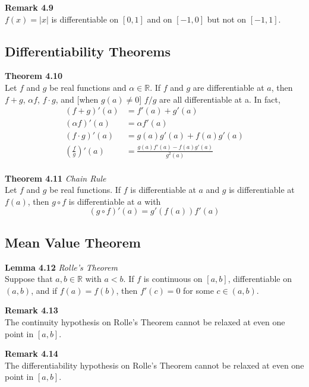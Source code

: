 \documentclass[8pt,landscape]{article}
\begin{document}
\begin{multicols}{3}
    \textbf{Remark 4.9} \\
    $f(x) = |x|$ is differentiable on $[0, 1]$ and on $[-1, 0]$ but not on $[-1, 1]$.

    \subsection{Differentiability Theorems}

    \textbf{Theorem 4.10} \\
    Let $f$ and $g$ be real functions and $\alpha \in \mathbb{R}$.
    If $f$ and $g$ are differentiable at $a$, then $f+g$, $\alpha f$, $f \cdot g$,
    and [when $g(a) \neq 0$] $f/g$ are all differentiable at a.
    In fact,
    \begin{align*}{}
        (f+g)'(a) &= f'(a) + g'(a) \\
        (\alpha f)'(a) &= \alpha f'(a) \\
        (f \cdot g)'(a) &= g(a) g'(a) + f(a) g'(a) \\
        \left( \frac{f}{g}\right)'(a) &= \frac{g(a) f'(a) - f(a) g'(a)}{g^2(a)} \\
    \end{align*}

    \textbf{Theorem 4.11} \emph{Chain Rule} \\
    Let $f$ and $g$ be real functions.
    If $f$ is differentiable at $a$ and $g$ is differentiable at $f(a)$, then
    $g \circ f$ is differentiable at $a$ with
    \[
        (g \circ f)'(a) = g'(f(a))f'(a)
    \]

    \subsection{Mean Value Theorem}

    \textbf{Lemma 4.12} \emph{Rolle's Theorem} \\
    Suppose that $a, b \in \mathbb{R}$ with $a < b$.
    If $f$ is continuous on $[a, b]$, differentiable on $(a, b)$, and if $f(a) = f(b)$,
    then $f'(c) = 0$ for some $c \in (a, b)$.

    \textbf{Remark 4.13} \\
    The continuity hypothesis on Rolle's Theorem cannot be relaxed at even one point
    in $[a, b]$.

    \textbf{Remark 4.14} \\
    The differentiability hypothesis on Rolle's Theorem cannot be relaxed at even one point
    in $[a, b]$.


\end{multicols}
\end{document}
